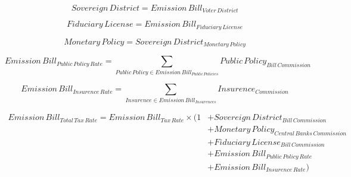 \documentclass[fleqn]{article}
\begin{document}
	
\Large
\color{black}
	
\begin{equation}
	Sovereign \, District = Emission \, Bill_{Voter \, District} 
\end{equation}

\begin{equation} 
	Fiduciary \, License = Emission \, Bill_{Fiduciary \, License}
\end{equation}

\begin{equation} 
	Monetary \, Policy = Sovereign \, District_{Monetary \, Policy}
\end{equation}

\begin{equation}
	Emission \, Bill_{Public \, Policy \, Rate} = \displaystyle\sum_{Public \, Policy \in Emission \, Bill_{Public \, Policies}} Public \, Policy_{Bill \, Commission} 	
\end{equation}

\begin{equation}
	Emission \, Bill_{Insurence \, Rate} = \displaystyle\sum_{Insurence \in Emission \, Bill_{Insurences}} Insurence_{Commission} 	
\end{equation}
	
\begin{equation}
	\begin{split}
		Emission \, Bill_{Total \, Tax \, Rate} = Emission \, Bill_{Tax \, Rate} \times (1 & + Sovereign \, District_{Bill \, Commission} \\
		& + Monetary \, Policy_{Central \, Banks \, Commission} \\
		& + Fiduciary \, License_{Bill \, Commission} \\
		& + Emission \, Bill_{Public \, Policy \, Rate} \\
		& + Emission \, Bill_{Insurence \, Rate})
	\end{split}
\end{equation}
	
\end{document}
